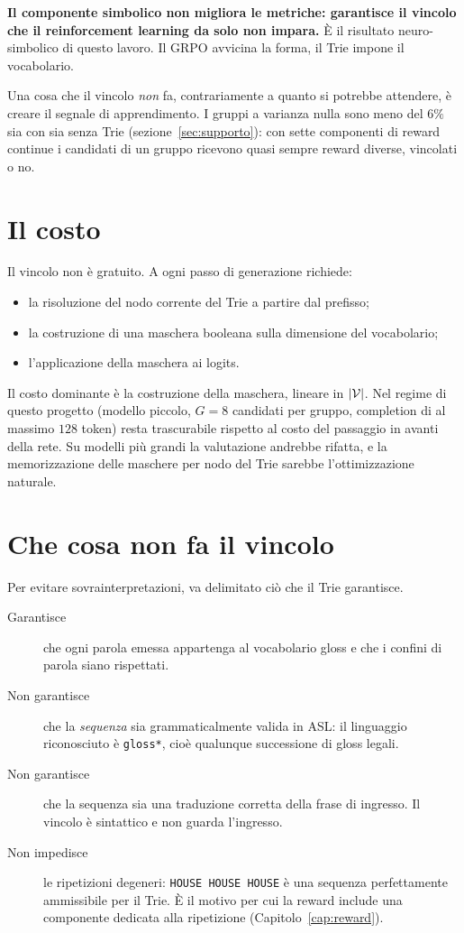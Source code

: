 \textbf{Il componente simbolico non migliora le metriche: garantisce il vincolo
che il reinforcement learning da solo non impara.} È il risultato neuro-simbolico
di questo lavoro. Il GRPO avvicina la forma, il Trie impone il vocabolario.

Una cosa che il vincolo \emph{non} fa, contrariamente a quanto si potrebbe
attendere, è creare il segnale di apprendimento. I gruppi a varianza nulla sono
meno del $6\%$ sia con sia senza Trie (sezione~\ref{sec:supporto}): con sette
componenti di reward continue i candidati di un gruppo ricevono quasi sempre
reward diverse, vincolati o no.

\section{Il costo}

Il vincolo non è gratuito. A ogni passo di generazione richiede:
\begin{itemize}
  \item la risoluzione del nodo corrente del Trie a partire dal prefisso;
  \item la costruzione di una maschera booleana sulla dimensione del vocabolario;
  \item l'applicazione della maschera ai logits.
\end{itemize}

Il costo dominante è la costruzione della maschera, lineare in $|\mathcal{V}|$. Nel
regime di questo progetto (modello piccolo, $G=8$ candidati per gruppo,
completion di al massimo $128$ token) resta trascurabile rispetto al costo del
passaggio in avanti della rete. Su modelli più grandi la valutazione andrebbe
rifatta, e la memorizzazione delle maschere per nodo del Trie sarebbe
l'ottimizzazione naturale.

\section{Che cosa non fa il vincolo}

Per evitare sovrainterpretazioni, va delimitato ciò che il Trie garantisce.

\begin{description}
  \item[Garantisce] che ogni parola emessa appartenga al vocabolario gloss e che
        i confini di parola siano rispettati.
  \item[Non garantisce] che la \emph{sequenza} sia grammaticalmente valida in
        ASL: il linguaggio riconosciuto è \texttt{gloss*}, cioè qualunque
        successione di gloss legali.
  \item[Non garantisce] che la sequenza sia una traduzione corretta della frase
        di ingresso. Il vincolo è sintattico e non guarda l'ingresso.
  \item[Non impedisce] le ripetizioni degeneri: \texttt{HOUSE HOUSE HOUSE} è una
        sequenza perfettamente ammissibile per il Trie. È il motivo per cui la
        reward include una componente dedicata alla ripetizione
        (Capitolo~\ref{cap:reward}).
\end{description}

